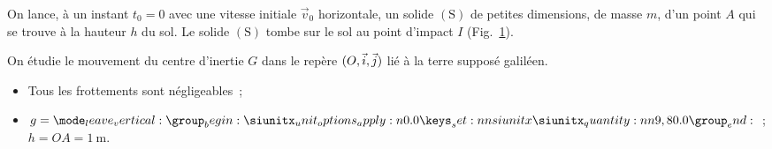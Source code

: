 \begin{minipage}{0.64\linewidth}
    On lance, à un instant $t_{0}=0$ avec une vitesse initiale $\vec{v}_{0}$
    horizontale, un solide $\mathrm{(S)}$ de petites dimensions, de masse $m$,
    d'un point $A$ qui se trouve à la hauteur $h$ du sol. Le solide
    $\mathrm{(S)}$ tombe sur le sol au point d'impact $I$
    (Fig.~\ref{fig:2bac_svt_national_2016_normale_phys_ex3_1}).
    
    On étudie le mouvement du centre d'inertie $G$ dans le repère $(O,\vec{i},\vec{j})$
    lié à la terre supposé galiléen.
    \begin{donnees}
        \begin{itemize}
          \item Tous les frottements sont négligeables~;
          \item $g=\qty{9,8}{\a}$~; $h=OA=\qty{1}{\meter}$.
        \end{itemize}
    \end{donnees}
\end{minipage}
\hfill
\begin{minipage}{0.35\linewidth}
    \begin{figure}[H]
        \centering
        \caption{}
        \label{fig:2bac_svt_national_2016_normale_phys_ex3_1}
    \end{figure}
\end{minipage}
